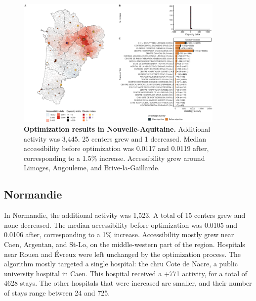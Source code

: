 \begin{figure}[H]
    \includegraphics[width=0.9\textwidth]{images/camion/optim_region/optim_Nouvelle-Aquitaine.png}
    \centering
    \caption{ \textbf{Optimization results in Nouvelle-Aquitaine.} Additional
        activity was 3,445. 25 centers grew and 1 decreased. Median
        accessibility before optimization was 0.0117 and 0.0119 after,
        corresponding to a 1.5\% increase. Accessibility grew around Limoges,
        Angouleme, and Brive-la-Gaillarde. }
\end{figure}

\subsection*{Normandie}

In Normandie, the additional activity was 1,523. A total of 15 centers grew and
none decreased. The median accessibility before optimization was 0.0105 and 0.0106 after,
corresponding to a 1\% increase. Accessibility mostly grew near Caen, Argentan, and
St-Lo, on the middle-western part of the region. Hospitals near Rouen and Évreux
were left unchanged by the optimization process. The algorithm mostly targeted
a single hospital: the \ac{chru} Cote de Nacre, a public university hospital in
Caen. This hospital received a +771 activity, for a total of 4628 stays. The
other hospitals that were increased are smaller, and their number of stays
range between 24 and 725.

